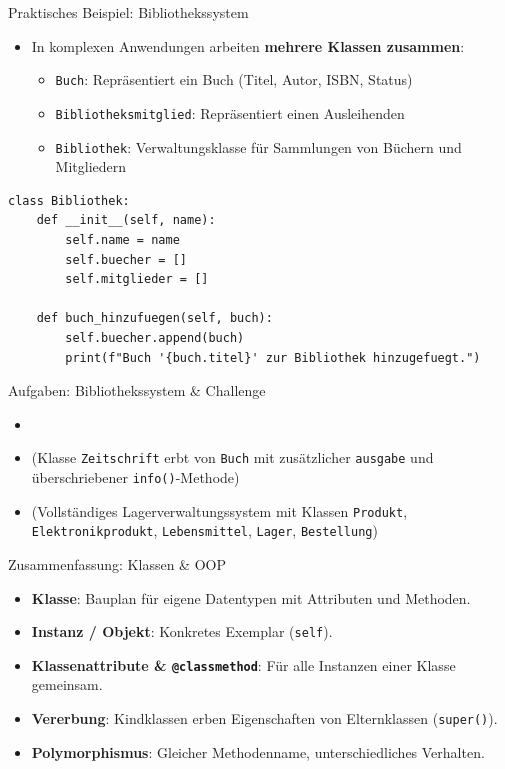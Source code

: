 \begin{frame}[fragile]{Praktisches Beispiel: Bibliothekssystem}
	\begin{itemize}
		\item In komplexen Anwendungen arbeiten \textbf{mehrere Klassen zusammen}:
		      \begin{itemize}
			      \item \lstinline|Buch|: Repräsentiert ein Buch (Titel, Autor, ISBN, Status)
			      \item \lstinline|Bibliotheksmitglied|: Repräsentiert einen Ausleihenden
			      \item \lstinline|Bibliothek|: Verwaltungsklasse für Sammlungen von Büchern und Mitgliedern
		      \end{itemize}
	\end{itemize}
	\pause
	\begin{lstlisting}[basicstyle=\ttfamily\scriptsize]
class Bibliothek:
    def __init__(self, name):
        self.name = name
        self.buecher = []
        self.mitglieder = []

    def buch_hinzufuegen(self, buch):
        self.buecher.append(buch)
        print(f"Buch '{buch.titel}' zur Bibliothek hinzugefuegt.")
\end{lstlisting}
\end{frame}

\begin{frame}[fragile]{Aufgaben: Bibliothekssystem \& Challenge}
	\begin{itemize}
		\item {}
		\item {} (Klasse \lstinline|Zeitschrift| erbt von \lstinline|Buch| mit zusätzlicher \lstinline|ausgabe| und überschriebener \lstinline|info()|-Methode)
		\item {} (Vollständiges Lagerverwaltungssystem mit Klassen \lstinline|Produkt|, \lstinline|Elektronikprodukt|, \lstinline|Lebensmittel|, \lstinline|Lager|, \lstinline|Bestellung|)
	\end{itemize}
\end{frame}

\begin{frame}[fragile]{Zusammenfassung: Klassen \& OOP}
	\begin{itemize}[<+->]
		\item \textbf{Klasse}: Bauplan für eigene Datentypen mit Attributen und Methoden.
		\item \textbf{Instanz / Objekt}: Konkretes Exemplar (\lstinline|self|).
		\item \textbf{Klassenattribute \& \lstinline|@classmethod|}: Für alle Instanzen einer Klasse gemeinsam.
		\item \textbf{Vererbung}: Kindklassen erben Eigenschaften von Elternklassen (\lstinline|super()|).
		\item \textbf{Polymorphismus}: Gleicher Methodenname, unterschiedliches Verhalten.
	\end{itemize}
\end{frame}